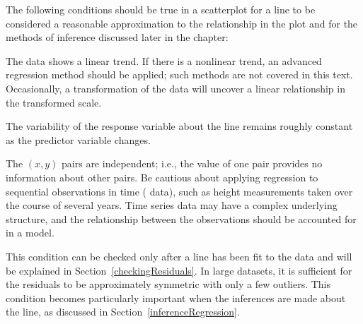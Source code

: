 The following conditions should be true in a scatterplot for a line to be considered a reasonable approximation to the relationship in the plot and for the methods of inference discussed later in the chapter:




\begin{description}
\setlength{\itemsep}{0mm}
\item[1 Linearity.] The data shows a linear trend. If there is a nonlinear trend, an advanced regression method should be applied; such methods are not covered in this text.  Occasionally, a transformation of the data will uncover a linear relationship in the transformed scale.
\item[2 Constant variability.] The variability of the response variable about the line remains roughly constant as the predictor variable changes.
\item[3 Independent observations.]  The $(x,y)$ pairs are independent; i.e., the value of one pair provides no information about other pairs. Be cautious about applying regression to sequential observations in time ( data), such as height measurements taken over the course of several years. Time series data may have a complex underlying structure, and the relationship between the observations should be accounted for in a model. 
\item[4 Residuals that are approximately normally distributed.] This condition can be checked only after a line has been fit to the data and will be explained in Section~\ref{checkingResiduals}. In large datasets, it is sufficient for the residuals to be approximately symmetric with only a few outliers. This condition becomes particularly important when the inferences are made about the line, as discussed in Section~\ref{inferenceRegression}.  
\end{description}

